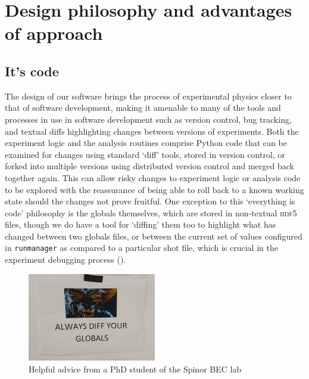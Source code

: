 \section{Design philosophy and advantages of approach}

\subsection{It's code}\label{sec:its_code}
The design of our software brings the process of experimental physics closer to that of software development, making it amenable to many of the tools and processes in use in software development such as version control, bug tracking, and textual diffs highlighting changes between versions of experiments. Both the experiment logic and the analysis routines comprise Python code that can be examined for changes using standard `diff' tools, stored in version control, or forked into multiple versions using distributed version control and merged back together again. This can allow risky changes to experiment logic or analysis code to be explored with the reassurance of being able to roll back to a known working state should the changes not prove fruitful. One exception to this `everything is code' philosophy is the globals themselves, which are stored in non-textual \textsc{hdf5} files, though we do have a tool for `diffing' them too to highlight what has changed between two globals files, or between the current set of values configured in \texttt{runmanager} as compared to a particular shot file, which is crucial in the experiment debugging process ().

\begin{figure}
\begin{center}
\includegraphics[width=0.5\textwidth]{figures/software/globals_diff.png}
\caption{Helpful advice from a PhD student of the Spinor BEC lab}\label{fig:globals_diff}
\end{center}
\end{figure}

